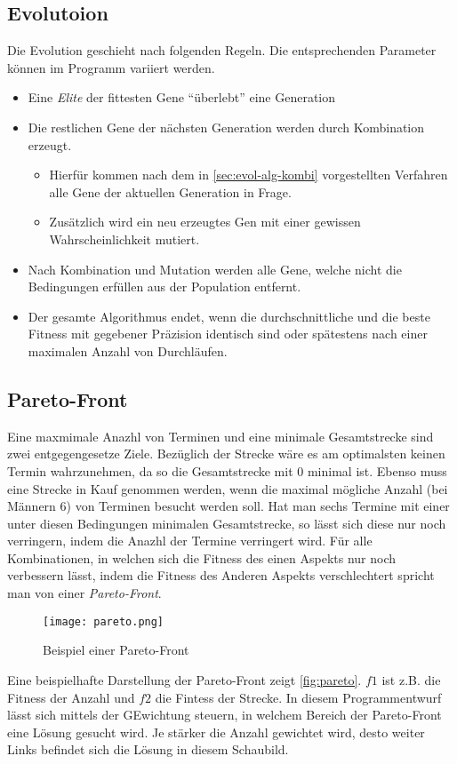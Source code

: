 \subsection{Evolutoion}
Die Evolution geschieht nach folgenden Regeln.
Die entsprechenden Parameter können im Programm variiert werden.
\begin{itemize}
    \item Eine \emph{Elite} der fittesten Gene \enquote{überlebt} eine Generation
    \item Die restlichen Gene der nächsten Generation werden durch Kombination erzeugt.
    \begin{itemize}
        \item Hierfür kommen nach dem in \autoref{sec:evol-alg-kombi} vorgestellten Verfahren alle Gene der aktuellen Generation in Frage.
        \item Zusätzlich wird ein neu erzeugtes Gen mit einer gewissen Wahrscheinlichkeit mutiert.
    \end{itemize}
    \item Nach Kombination und Mutation werden alle Gene, welche nicht die Bedingungen erfüllen aus der Population entfernt.
    \item Der gesamte Algorithmus endet, wenn die durchschnittliche und die beste Fitness mit gegebener Präzision identisch sind oder spätestens nach einer maximalen Anzahl von Durchläufen.
\end{itemize}

\subsection{Pareto-Front}
Eine maxmimale Anazhl von Terminen und eine minimale Gesamtstrecke sind zwei entgegengesetze Ziele.
Bezüglich der Strecke wäre es am optimalsten keinen Termin wahrzunehmen,
da so die Gesamtstrecke mit $0$ minimal ist.
Ebenso muss eine Strecke in Kauf genommen werden,
wenn die maximal mögliche Anzahl (bei Männern $6$) von Terminen besucht werden soll.
Hat man sechs Termine mit einer unter diesen Bedingungen minimalen Gesamtstrecke,
so lässt sich diese nur noch verringern, indem die Anazhl der Termine verringert wird.
Für alle Kombinationen, in welchen sich die Fitness des einen Aspekts nur noch verbessern lässt,
indem die Fitness des Anderen Aspekts verschlechtert spricht man von einer \emph{Pareto-Front}.

\begin{figure}[h]
    \centering
    \texttt{[image: pareto.png]}
    \caption{Beispiel einer Pareto-Front \cite{Paretofr62:online}}
    \label{fig:pareto}
\end{figure}

Eine beispielhafte Darstellung der Pareto-Front zeigt \autoref{fig:pareto}.
$f1$ ist z.B. die Fitness der Anzahl und $f2$ die Fintess der Strecke.
In diesem Programmentwurf lässt sich mittels der GEwichtung steuern,
in welchem Bereich der Pareto-Front eine Lösung gesucht wird.
Je stärker die Anzahl gewichtet wird, desto weiter Links befindet sich die Lösung in diesem Schaubild.
